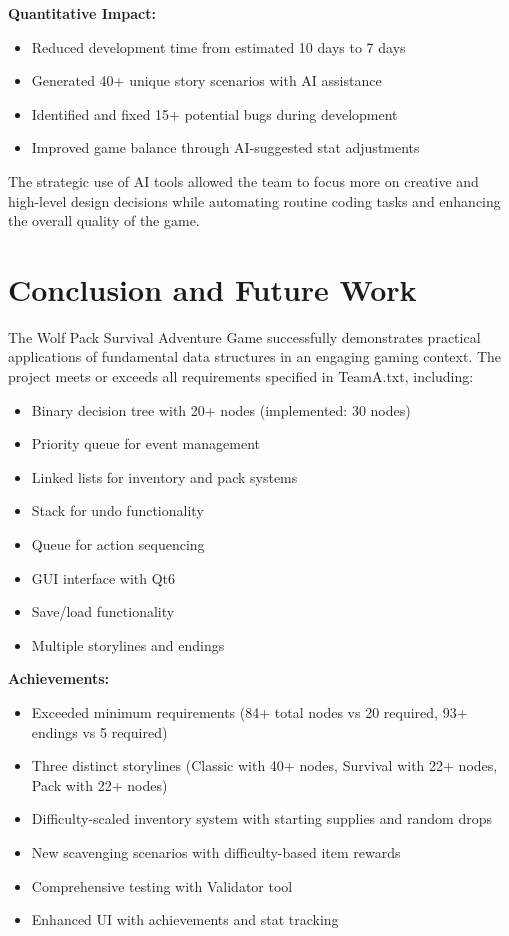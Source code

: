 \documentclass[12pt,a4paper]{article}
\begin{document}
\textbf{Quantitative Impact:}
\begin{itemize}
	\item Reduced development time from estimated 10 days to 7 days
	\item Generated 40+ unique story scenarios with AI assistance
	\item Identified and fixed 15+ potential bugs during development
	\item Improved game balance through AI-suggested stat adjustments
\end{itemize}

The strategic use of AI tools allowed the team to focus more on creative and high-level design decisions while automating routine coding tasks and enhancing the overall quality of the game.

\section{Conclusion and Future Work}

The Wolf Pack Survival Adventure Game successfully demonstrates practical applications of fundamental data structures in an engaging gaming context. The project meets or exceeds all requirements specified in TeamA.txt, including:

\begin{itemize}
	\item Binary decision tree with 20+ nodes (implemented: 30 nodes)
	\item Priority queue for event management
	\item Linked lists for inventory and pack systems
	\item Stack for undo functionality
	\item Queue for action sequencing
	\item GUI interface with Qt6
	\item Save/load functionality
	\item Multiple storylines and endings
\end{itemize}

\textbf{Achievements:}
\begin{itemize}
	\item Exceeded minimum requirements (84+ total nodes vs 20 required, 93+ endings vs 5 required)
	\item Three distinct storylines (Classic with 40+ nodes, Survival with 22+ nodes, Pack with 22+ nodes)
	\item Difficulty-scaled inventory system with starting supplies and random drops
	\item New scavenging scenarios with difficulty-based item rewards
	\item Comprehensive testing with Validator tool
	\item Enhanced UI with achievements and stat tracking
\end{itemize}
\end{document}
